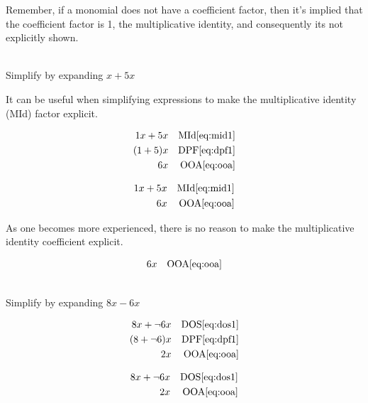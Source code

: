 \documentclass[20150903-160354-rs2.2-MarksMathNotebook.tex]{subfiles}
\begin{document}
\begin{remark}
Remember, if a monomial does not have a coefficient factor, then it's implied that the coefficient factor is 1, the multiplicative identity, and consequently its not explicitly shown.
\end{remark}

\begin{example}[id:20141121-185558] \label{20141121-185558} \hfill \\

Simplify by expanding $x+5x$

\soln

\solnsteps

It can be useful when simplifying expressions to make the multiplicative identity (MId) factor explicit.

\begin{align*}
1x+5x && \text{MId} \eqref{eq:mid1} \\
(1+5)x && \text{DPF} \eqref{eq:dpf1} \\
6x && \text{OOA} \eqref{eq:ooa}
\end{align*}

\soln

\lesssteps
\begin{align*}
1x+5x && \text{MId} \eqref{eq:mid1} \\
6x && \text{OOA} \eqref{eq:ooa}
\end{align*}

As one becomes more experienced, there is no reason to make the multiplicative identity coefficient explicit.

\soln

\lesssteps
\begin{align*}
6x && \text{OOA} \eqref{eq:ooa}
\end{align*}

\end{example}


\begin{example}[id:20141121-190857] \label{20141121-190857} \hfill \\

Simplify by expanding $8x-6x$

\soln

\solnsteps
\begin{align*}
8x + \neg 6x && \text{DOS} \eqref{eq:dos1} \\
(8+\neg 6)x && \text{DPF} \eqref{eq:dpf1} \\
2x && \text{OOA} \eqref{eq:ooa}
\end{align*}

\soln

\lesssteps
\begin{align*}
8x + \neg 6x && \text{DOS} \eqref{eq:dos1} \\
2x && \text{OOA} \eqref{eq:ooa}
\end{align*}
\end{example}
\end{document}
